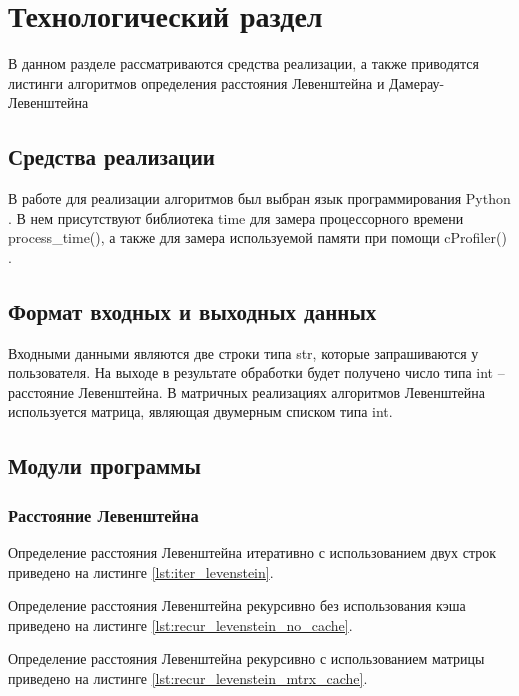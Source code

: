 \chapter{Технологический раздел}
В данном разделе рассматриваются средства реализации, а также приводятся листинги алгоритмов определения расстояния Левенштейна и Дамерау-Левенштейна

\section{Средства реализации}
В работе для реализации алгоритмов был выбран язык программирования Python \cite{python}. В нем присутствуют библиотека time \cite{process_time} для замера процессорного времени process\_time(), а также для замера используемой памяти при помощи cProfiler() \cite{profiler}.

\section{Формат входных и выходных данных}
Входными данными являются две строки типа str, которые запрашиваются у пользователя. На выходе в результате обработки будет получено число типа int -- расстояние Левенштейна. В матричных реализациях алгоритмов Левенштейна используется матрица, являющая двумерным списком типа int.

\section{Модули программы}
\subsection{Расстояние Левенштейна}
Определение расстояния Левенштейна итеративно с использованием двух строк приведено на листинге \ref{lst:iter_levenstein}.
\newpage


Определение расстояния Левенштейна рекурсивно без использования кэша приведено на листинге \ref{lst:recur_levenstein_no_cache}.


Определение расстояния Левенштейна рекурсивно с использованием матрицы приведено на листинге \ref{lst:recur_levenstein_mtrx_cache}.
\newpage


